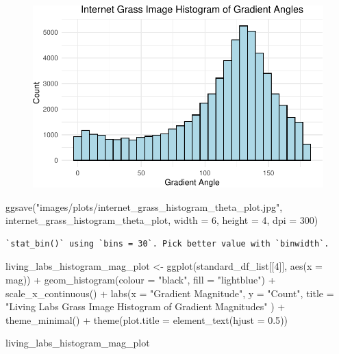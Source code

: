 \documentclass[
  letterpaper,
  DIV=11,
  numbers=noendperiod]{scrreprt}
\newenvironment{Shaded}{\begin{snugshade}}{\end{snugshade}}
\newcommand{\AttributeTok}[1]{\textcolor[rgb]{0.40,0.45,0.13}{#1}}
\newcommand{\DecValTok}[1]{\textcolor[rgb]{0.68,0.00,0.00}{#1}}
\newcommand{\FloatTok}[1]{\textcolor[rgb]{0.68,0.00,0.00}{#1}}
\newcommand{\FunctionTok}[1]{\textcolor[rgb]{0.28,0.35,0.67}{#1}}
\newcommand{\NormalTok}[1]{\textcolor[rgb]{0.00,0.23,0.31}{#1}}
\newcommand{\OtherTok}[1]{\textcolor[rgb]{0.00,0.23,0.31}{#1}}
\newcommand{\SpecialCharTok}[1]{\textcolor[rgb]{0.37,0.37,0.37}{#1}}
\newcommand{\StringTok}[1]{\textcolor[rgb]{0.13,0.47,0.30}{#1}}
\begin{document}
\begin{figure}[H]

{\centering \includegraphics{results_files/figure-pdf/unnamed-chunk-11-2.pdf}

}

\end{figure}

\begin{Shaded}
\begin{Highlighting}[]
\FunctionTok{ggsave}\NormalTok{(}\StringTok{"images/plots/internet\_grass\_histogram\_theta\_plot.jpg"}\NormalTok{, internet\_grass\_histogram\_theta\_plot, }\AttributeTok{width =} \DecValTok{6}\NormalTok{, }\AttributeTok{height =} \DecValTok{4}\NormalTok{, }\AttributeTok{dpi =} \DecValTok{300}\NormalTok{)}
\end{Highlighting}
\end{Shaded}

\begin{verbatim}
`stat_bin()` using `bins = 30`. Pick better value with `binwidth`.
\end{verbatim}

\begin{Shaded}
\begin{Highlighting}[]
\NormalTok{living\_labs\_histogram\_mag\_plot }\OtherTok{\textless{}{-}}
  \FunctionTok{ggplot}\NormalTok{(standard\_df\_list[[}\DecValTok{4}\NormalTok{]], }\FunctionTok{aes}\NormalTok{(}\AttributeTok{x =}\NormalTok{ mag)) }\SpecialCharTok{+}
  \FunctionTok{geom\_histogram}\NormalTok{(}\AttributeTok{colour =} \StringTok{"black"}\NormalTok{, }\AttributeTok{fill =} \StringTok{"lightblue"}\NormalTok{) }\SpecialCharTok{+}
  \FunctionTok{scale\_x\_continuous}\NormalTok{() }\SpecialCharTok{+} 
  \FunctionTok{labs}\NormalTok{(}\AttributeTok{x =} \StringTok{"Gradient Magnitude"}\NormalTok{, }
       \AttributeTok{y =} \StringTok{"Count"}\NormalTok{, }
       \AttributeTok{title =} \StringTok{"Living Labs Grass Image Histogram of Gradient Magnitudes"}
\NormalTok{       ) }\SpecialCharTok{+}
  \FunctionTok{theme\_minimal}\NormalTok{() }\SpecialCharTok{+}
  \FunctionTok{theme}\NormalTok{(}\AttributeTok{plot.title =} \FunctionTok{element\_text}\NormalTok{(}\AttributeTok{hjust =} \FloatTok{0.5}\NormalTok{))}

\NormalTok{living\_labs\_histogram\_mag\_plot}
\end{Highlighting}
\end{Shaded}
\end{document}
